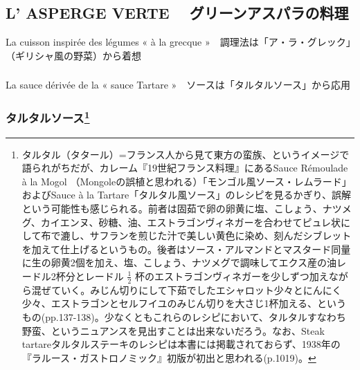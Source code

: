 \hypertarget{l-asperge-verte-ux30b0ux30eaux30fcux30f3ux30a2ux30b9ux30d1ux30e9ux306eux6599ux7406}{%
\subsection{L' ASPERGE VERTE
　グリーンアスパラの料理}\label{l-asperge-verte-ux30b0ux30eaux30fcux30f3ux30a2ux30b9ux30d1ux30e9ux306eux6599ux7406}}

La cuisson inspirée des légumes « à la grecque
»　調理法は「ア・ラ・グレック」（ギリシャ風の野菜）から着想

\hypertarget{section}{%
\subsubsection{}\label{section}}

La sauce dérivée de la « sauce Tartare
»　ソースは「タルタルソース」から応用

\hypertarget{sauce-tartare}{%
\subsubsection[タルタルソース]{\texorpdfstring{タルタルソース\footnote{タルタル（タタール）=フランス人から見て東方の蛮族、というイメージで語られがちだが、カレーム『19世紀フランス料理』にあるSauce
  Rémoulade à la Mogol
  （Mongoleの誤植と思われる）「モンゴル風ソース・レムラード」およびSauce
  à la
  Tartare「タルタル風ソース」のレシピを見るかぎり、誤解という可能性も感じられる。前者は固茹で卵の卵黄に塩、こしょう、ナツメグ、カイエンヌ、砂糖、油、エストラゴンヴィネガーを合わせてピュレ状にして布で漉し、サフランを煎じた汁で美しい黄色に染め、刻んだシブレットを加えて仕上げるというもの。後者はソース・アルマンドとマスタード同量に生の卵黄2個を加え、塩、こしょう、ナツメグで調味してエクス産の油レードル2杯分とレードル
  \(\frac{1}{2}\)
  杯のエストラゴンヴィネガーを少しずつ加えながら混ぜていく。みじん切りにして下茹でしたエシャロット少々とにんにく少々、エストラゴンとセルフイユのみじん切りを大さじ1杯加える、というもの(pp.137-138)。少なくともこれらのレシピにおいて、タルタルすなわち野蛮、というニュアンスを見出すことは出来ないだろう。なお、Steak
  tartareタルタルステーキのレシピは本書には掲載されておらず、1938年の『ラルース・ガストロノミック』初版が初出と思われる(p.1019)。}}{タルタルソース}}\label{sauce-tartare}}


 

